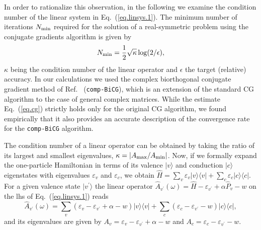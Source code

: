 \documentclass[twocolumn,prb,showpacs,superscriptaddress]{revtex4}
\def\w{\omega}
\def\>{\rangle}
\def\<{\langle}
\def\H{\hat{H}}
\def\E{\varepsilon}
\def\vp{{v^\prime}}
\begin{document}
In order to rationalize this observation, in the following we examine
the condition number of the linear system in Eq.\ (\ref{eq.linsys.1}).
The minimum number of iterations $N_{\rm min}$ required for the solution of
a real-symmetric problem using the conjugate gradients algorithm is given by
  \begin{equation}\label{eq.cg}
  N_{\rm min} = \frac{1}{2}\sqrt{\kappa} \log(2/\epsilon),
  \end{equation}
$\kappa$ being the condition number of the linear operator and $\epsilon$ the
target (relative) accuracy.\cite{painless.cg} In our calculations we used the 
complex biorthogonal conjugate gradient method of Ref.\  
({\tt comp-BiCG}), which is an extension of the standard CG algorithm to the 
case of general complex matrices. While the estimate Eq.\ (\ref{eq.cg}) strictly 
holds only for the original CG algorithm, we found empirically that it also 
provides an accurate description of the convergence rate for the {\tt comp-BiCG} 
algorithm.

The condition number of a linear operator can be obtained by taking the ratio 
of its largest and smallest eigenvalues, $\kappa=|A_{\rm max}/A_{\rm min}|$.
Now, if we formally expand the one-particle Hamiltonian in terms of its valence 
$|v\>$ and conduction $|c\>$ eigenstates with eigenvalues $\E_v$ and $\E_c$, we obtain
$\H = \sum_v \E_v |v\>\<v| + \sum_c \E_c |c\>\<c|$. For a given valence state 
$|v^\prime\>$ the linear operator $\hat{A}_\vp (\w) = \H - \E_\vp + \alpha \hat{P}_v - w$ 
on the lhs of Eq.\ (\ref{eq.linsys.1}) reads
  \begin{equation}
  \hat{A}_\vp (\w)  = 
  \sum_v ( \E_v - \E_\vp + \alpha - w ) |v\>\<v| 
  + \sum_c ( \E_c - \E_\vp - w ) |c\>\<c|,
  \end{equation}
and its eigenvalues are given by $A_v = \E_v - \E_\vp + \alpha - w$ and
$A_c = \E_c - \E_\vp - w$. 
\end{document}
